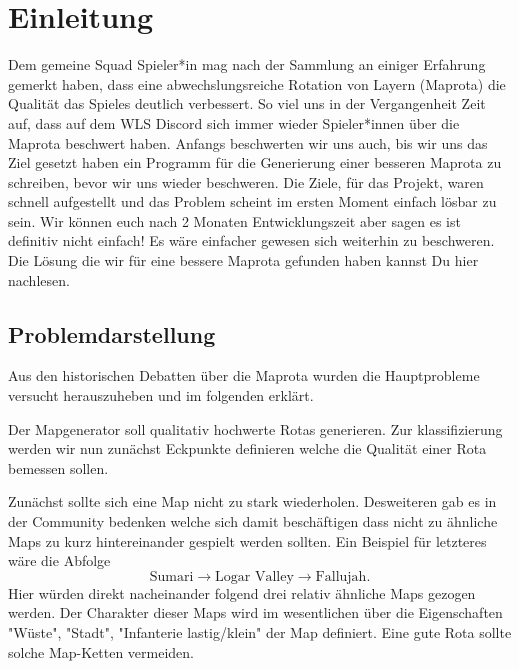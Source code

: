 \section{Einleitung}
        
        Dem gemeine Squad Spieler*in mag nach der Sammlung an einiger Erfahrung gemerkt haben, dass eine abwechslungsreiche Rotation von Layern (Maprota) 
        die Qualität das Spieles deutlich verbessert. So viel uns in der Vergangenheit Zeit auf, dass auf dem WLS Discord sich immer wieder 
        Spieler*innen über die Maprota beschwert haben. Anfangs beschwerten wir uns auch, bis wir uns das Ziel gesetzt haben ein Programm 
        für die Generierung einer besseren Maprota zu schreiben, bevor wir uns wieder beschweren. 
        Die Ziele, für das Projekt, waren schnell aufgestellt und das Problem scheint im ersten Moment einfach lösbar zu sein.
        Wir können euch nach 2 Monaten Entwicklungszeit aber sagen es ist definitiv nicht einfach! Es wäre einfacher gewesen sich weiterhin zu beschweren.
        Die Lösung die wir für eine bessere Maprota gefunden haben kannst Du hier nachlesen.  

        \subsection{Problemdarstellung}
            Aus den historischen Debatten über die Maprota wurden die Hauptprobleme versucht herauszuheben und im folgenden erklärt.

            Der Mapgenerator soll qualitativ hochwerte Rotas generieren.
            Zur klassifizierung werden wir nun zunächst Eckpunkte definieren welche die Qualität einer Rota bemessen sollen.

            Zunächst sollte sich eine Map nicht zu stark wiederholen.
            Desweiteren gab es in der Community bedenken welche sich damit beschäftigen dass nicht zu ähnliche Maps zu kurz hintereinander gespielt werden sollten. 
            Ein Beispiel für letzteres wäre die Abfolge 
            \begin{equation*}
                \text{Sumari} \rightarrow \text{Logar Valley} \rightarrow \text{Fallujah}.
            \end{equation*}
            Hier würden direkt nacheinander folgend drei relativ ähnliche Maps gezogen werden. 
            Der Charakter dieser Maps wird im wesentlichen über die Eigenschaften "Wüste", "Stadt", "Infanterie lastig/klein" der Map definiert.
            Eine gute Rota sollte solche Map-Ketten vermeiden.

